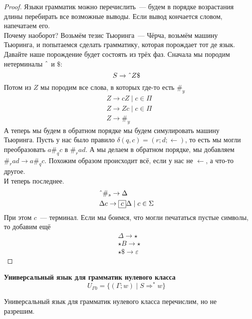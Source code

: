 \documentclass{article}
\begin{document}
    \begin{proof}
        Языки грамматик можно перечислить~--- будем в порядке возрастания длины перебирать все возможные выводы. Если вывод кончается словом, напечатаем его.\\
        Почему наоборот? Возьмём тезис Тьюринга~--- Чёрча, возьмём машину Тьюринга, и попытаемся сделать грамматику, которая порождает тот де язык. Давайте наше порождение будет состоять из трёх фаз. Сначала мы породим нетерминалы $\char`\^$ и $\$$:
        $$
        S\to\char`\^Z\$
        $$
        Потом из $Z$ мы породим все слова, в которых где-то есть $\#_y$
        \begin{align*}
            &Z\to cZ\mid c\in\Pi\\
            &Z\to Zc\mid c\in\Pi\\
            &Z\to \#_y
        \end{align*}
        А теперь мы будем в обратном порядке мы будем симулировать машину Тьюринга. Пусть у нас было правило $\delta(q,c)=(r;d;\leftarrow)$, то есть мы могли преобразовать $a\#_qc$ в $\#_rad$. А мы делаем в обратном порядке, мы добавляем $\#_rad\to a\#_qc$. Похожим образом происходит всё, если у нас не $\leftarrow$, а что-то другое.\\
        И теперь последнее.
        \begin{align*}
            &\char`\^\#_s\to\Delta\\
            &\Delta c\to\boxed{c}\Delta\mid c\in\Sigma
        \end{align*}
        При этом $\boxed c$~--- терминал. Если мы боимся, что могли печататься пустые символы, то добавим ещё
        \begin{align*}
            &\Delta\to\star\\
            &\star B\to\star\\
            &\star\$\to\varepsilon
        \end{align*}
    \end{proof}
    \begin{definition}
        \textbf{Универсальный язык для грамматик нулевого класса}
        $$
        U_{\Gamma0}=\{(\Gamma;w)\mid S\Rightarrow^*w\}
        $$
    \end{definition}
    \begin{claim}
        Универсальный язык для грамматик нулевого класса перечислим, но не разрешим.
    \end{claim}
\end{document}
